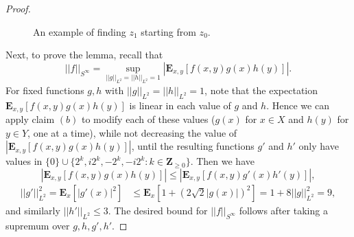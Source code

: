 \documentclass[reqno,11pt]{amsart}
\theoremstyle{definition}
\theoremstyle{remark}
\numberwithin{equation}{section}
\newcommand{\Z}{\mathbf{Z}}
\newcommand{\E}{\mathbf{E}}
\begin{document}
\begin{proof}
\begin{figure}[ht]
\begin{center}
\end{center}
\label{fig:modify-linear-function}
\caption{An example of finding $z_1$ starting from $z_0$.}
\end{figure}

Next, to prove the lemma, recall that
\[
    ||f||_{S^\infty} = \sup_{||g||_{L^2}=||h||_{L^2}=1} \left\vert \E_{x,y}[f(x,y)g(x)h(y)] \right\vert.
\]
For fixed functions $g, h$ with $||g||_{L^2} = ||h||_{L^2} = 1$, note that the expectation $\E_{x,y}[f(x,y)g(x)h(y)]$ is linear in each value of $g$ and $h$. Hence we can apply claim $(b)$ to modify each of these values ($g(x)$ for $x \in X$ and $h(y)$ for $y \in Y$, one at a time), while not decreasing the value of $|\E_{x,y}[f(x,y)g(x)h(y)]|$, until the resulting functions $g'$ and $h'$ only have values in $\{0\} \cup \{2^k, i2^k, -2^k, -i2^k : k \in \Z_{\ge 0}\}$. Then we have
\[
    \left\vert \E_{x,y}[f(x,y)g(x)h(y)] \right\vert 
    \le 
    \left\vert \E_{x,y}[f(x,y)g'(x)h'(y)] \right\vert,
\]
\[
\begin{aligned}
    ||g'||_{L^2}^2 = \E_x\left[ |g'(x)|^2 \right] 
    &\le 
    \E_x \left[1 + \left(2\sqrt{2}|g(x)|\right)^2\right]
    =
    1 + 8||g||_{L^2}^2 = 9,
\end{aligned}
\]
and similarly $||h'||_{L^2} \le 3$. The desired bound for $||f||_{S^\infty}$ follows after taking a supremum over $g, h, g', h'$.


\end{proof}
\end{document}
